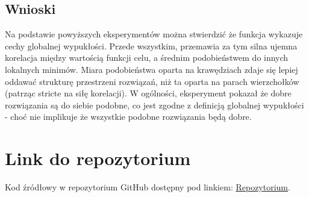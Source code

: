 \documentclass[11pt]{article}
\begin{document}
\subsection{Wnioski}\label{subsec:wnioski-wypuklosci}

Na podstawie powyższych eksperymentów można stwierdzić że funkcja wykazuje cechy globalnej wypukłości.
Przede wszystkim, przemawia za tym silna ujemna korelacja między wartością funkcji celu, a średnim podobieństwem do innych lokalnych minimów.
Miara podobieństwa oparta na krawędziach zdaje się lepiej oddawać strukturę przestrzeni rozwiązań, niż ta oparta na parach wierzchołków (patrząc stricte na siłę korelacji).
W ogólności, eksperyment pokazał że dobre rozwiązania są do siebie podobne, co jest zgodne z definicją globalnej wypukłości - choć nie implikuje że wszystkie podobne rozwiązania będą dobre.


\section{Link do repozytorium}\label{sec:link-do-repo}
Kod źródłowy w repozytorium GitHub dostępny pod linkiem:
\href{https://github.com/KotZPolibudy/PUT_IMO/tree/main/Lab6%20-%20Testy%20wypuklosci%20i%20wlasna%20metoda}{Repozytorium}.
\end{document}
